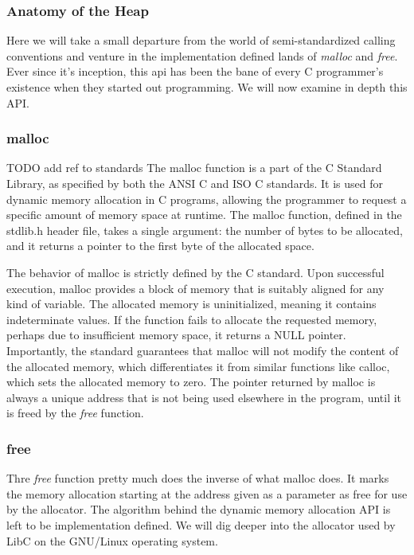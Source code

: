 \documentclass{article}
\begin{document}
\subsubsection{Anatomy of the Heap}
Here we will take a small departure
from the world of semi-standardized calling conventions and venture in the
implementation defined lands of \emph{malloc} and \emph{free}. Ever since it's
inception, this api has been the bane of every C programmer's existence when
they started out programming. We will now examine in depth this API.\@

\subsubsection{malloc}
TODO add ref to standards
The malloc function is a part of the C Standard Library, as specified by both
the ANSI C and ISO C standards. It is used for dynamic memory allocation in C
programs, allowing the programmer to request a specific amount of memory space
at runtime. The malloc function, defined in the stdlib.h header file, takes a
single argument: the number of bytes to be allocated, and it returns a pointer
to the first byte of the allocated space.

The behavior of malloc is strictly defined by the C standard. Upon successful
execution, malloc provides a block of memory that is suitably aligned for any
kind of variable. The allocated memory is uninitialized, meaning it contains
indeterminate values. If the function fails to allocate the requested memory,
perhaps due to insufficient memory space, it returns a NULL pointer.
Importantly, the standard guarantees that malloc will not modify the content of
the allocated memory, which differentiates it from similar functions like
calloc, which sets the allocated memory to zero. The pointer returned by malloc
is always a unique address that is not being used elsewhere in the program,
until it is freed by the \emph{free} function.

\subsubsection{free}
Thre \emph{free} function pretty much does the inverse of what malloc does. It
marks the memory allocation starting at the address given as a parameter as free
for use by the allocator. The algorithm behind the dynamic memory allocation API
is left to be implementation defined. We will dig deeper into the
allocator used by LibC on the GNU/Linux operating system.
\end{document}
